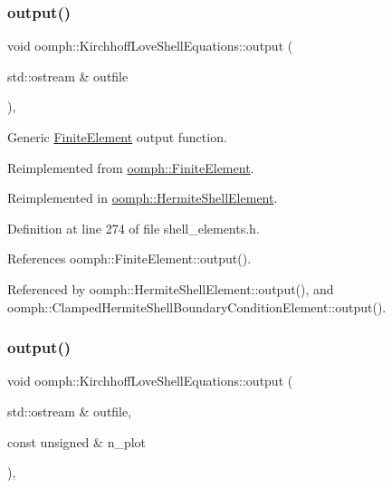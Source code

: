 \subsubsection{\texorpdfstring{output()}{output()}\hspace{0.1cm}{\footnotesize\ttfamily [1/4]}}
{\footnotesize\ttfamily void oomph\+::\+Kirchhoff\+Love\+Shell\+Equations\+::output (\begin{DoxyParamCaption}\item[{std\+::ostream \&}]{outfile }\end{DoxyParamCaption})\hspace{0.3cm}{\ttfamily [inline]}, {\ttfamily [virtual]}}



Generic \hyperlink{classoomph_1_1FiniteElement}{Finite\+Element} output function. 



Reimplemented from \hyperlink{classoomph_1_1FiniteElement_a2ad98a3d2ef4999f1bef62c0ff13f2a7}{oomph\+::\+Finite\+Element}.



Reimplemented in \hyperlink{classoomph_1_1HermiteShellElement_af2313040b66727088dc044738b652677}{oomph\+::\+Hermite\+Shell\+Element}.



Definition at line 274 of file shell\+\_\+elements.\+h.



References oomph\+::\+Finite\+Element\+::output().



Referenced by oomph\+::\+Hermite\+Shell\+Element\+::output(), and oomph\+::\+Clamped\+Hermite\+Shell\+Boundary\+Condition\+Element\+::output().

\mbox{\label{classoomph_1_1KirchhoffLoveShellEquations_a5173eb461b8c893b0dc657aae90192c7}} 
\subsubsection{\texorpdfstring{output()}{output()}\hspace{0.1cm}{\footnotesize\ttfamily [2/4]}}
{\footnotesize\ttfamily void oomph\+::\+Kirchhoff\+Love\+Shell\+Equations\+::output (\begin{DoxyParamCaption}\item[{std\+::ostream \&}]{outfile,  }\item[{const unsigned \&}]{n\+\_\+plot }\end{DoxyParamCaption})\hspace{0.3cm}{\ttfamily [inline]}, {\ttfamily [virtual]}}



